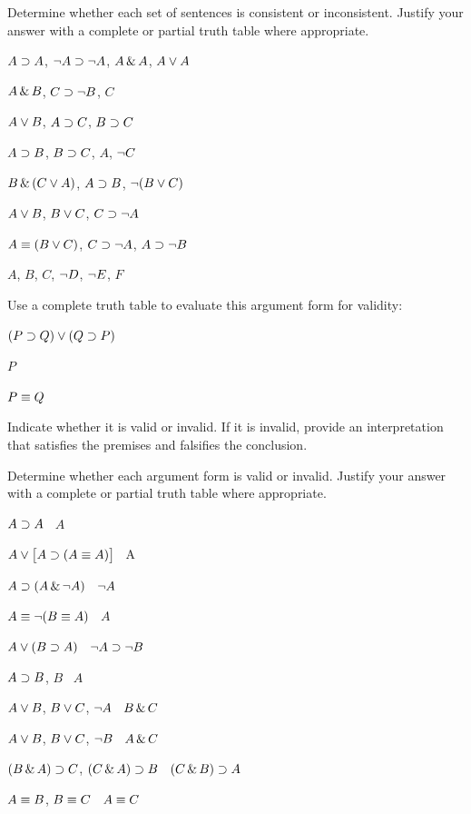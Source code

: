 \solutions
\problempart
\label{pr.TT.consistent}
Determine whether each set of sentences is consistent or inconsistent. Justify your answer with a complete or partial truth table where appropriate.
\begin{earg}
\item $A\supset A$, $\neg A \supset \neg A$, $A\,\&\, A$, $A\vee A$ %
\item $A \,\&\, B$, $C\supset \neg B$, $C$ %
\item $A\vee B$, $A\supset C$, $B\supset C$ %
\item $A\supset B$, $B\supset C$, $A$, $\neg C$ %
\item $B\,\&\,(C\vee A)$, $A\supset B$, $\neg(B\vee C)$  %
\item $A \vee B$, $B\vee C$, $C\supset \neg A$ %
\item $A\equiv(B\vee C)$, $C\supset \neg A$, $A\supset \neg B$ %
\item $A$, $B$, $C$, $\neg D$, $\neg E$, $F$ %
\end{earg}


\problempart
\label{HW3.B}

Use a complete truth table to evaluate this argument form for validity:

\begin{earg}
\item[] $(P \supset Q) \vee (Q \supset P)$
\item[] $P$
\item[\therefore] $P\equiv Q$
\end{earg}

Indicate whether it is valid or invalid. If it is invalid, provide an interpretation that satisfies the premises and falsifies the conclusion. 




\solutions
\problempart
\label{pr.TT.valid}
Determine whether each argument form is valid or invalid. Justify your answer with a complete or partial truth table where appropriate.
\begin{earg}
\item $A\supset A$ \therefore\ $A$ %
\item $A\vee\bigl[A\supset(A\equiv A)\bigr]$ \therefore\ A %
\item $A\supset(A\,\&\,\neg A)$ \therefore\ $\neg A$ %
\item $A\equiv\neg(B\equiv A)$ \therefore\ $A$ %
\item $A\vee(B\supset A)$ \therefore\ $\neg A \supset \neg B$ %
\item $A\supset B$, $B$ \therefore\ $A$ %
\item $A\vee B$, $B\vee C$, $\neg A$ \therefore\ $B \,\&\, C$ %
\item $A\vee B$, $B\vee C$, $\neg B$ \therefore\ $A \,\&\, C$ %
\item $(B\,\&\, A)\supset C$, $(C\,\&\, A)\supset B$ \therefore\ $(C\,\&\, B)\supset A$ %
\item $A\equiv B$, $B\equiv C$ \therefore\ $A\equiv C$ %
\end{earg}

